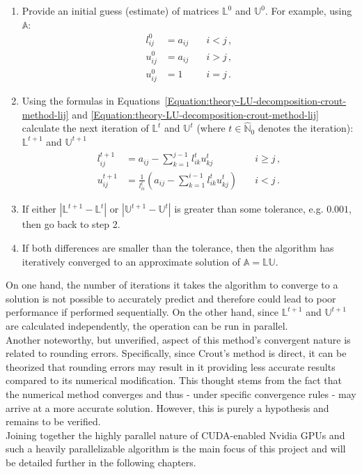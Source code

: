 \begin{enumerate}
	\item Provide an initial guess (estimate) of matrices $ \mathbb{L}^0 $ and $ \mathbb{U}^0 $. For example, using $ \mathbb{A} $:
		\begin{align}
			l_{ij}^{0} &= a_{ij} \quad &i < j \nonumber\,, \\
			u_{ij}^{0} &= a_{ij} \quad &i > j \nonumber\,, \\
			u_{ij}^{0} &= 1 \quad      &i = j \nonumber\,.
		\end{align}
	\item Using the formulas in Equations~\ref{Equation:theory-LU-decomposition-crout-method-lij} and \ref{Equation:theory-LU-decomposition-crout-method-lij} calculate the next iteration of $ \mathbb{L}^{t} $ and $ \mathbb{U}^{t} $ (where $ t \in \widehat{\mathbb{N}}_0 $ denotes the iteration): $ \mathbb{L}^{t+1} $ and $ \mathbb{U}^{t+1} $
		\begin{align}
			l_{ij}^{t+1} &= a_{ij} - \sum_{k=1}^{j-1}l_{ik}^{t}u_{kj}^{t} 								   		&\quad i \geq j \nonumber\,, \\
			u_{ij}^{t+1} &= \frac{1}{l_{ii}^{t}} \left ( a_{ij} - \sum_{k=1}^{i-1}l_{ik}^{t}u_{kj}^{t} \right ) &\quad i < j    \nonumber\,. 
		\end{align}
	\item If either $ \left | \mathbb{L}^{t+1} - \mathbb{L}^{t} \right | $ or $ \left | \mathbb{U}^{t+1} - \mathbb{U}^{t} \right | $ is greater than some tolerance, e.g. $ 0.001 $, then go back to step 2.
	\item If both differences are smaller than the tolerance, then the algorithm has iteratively converged to an approximate solution of $ \mathbb{A} = \mathbb{LU} $.
\end{enumerate}

On one hand, the number of iterations it takes the algorithm to converge to a solution is not possible to accurately predict and therefore could lead to poor performance if performed sequentially. On the other hand, since $ \mathbb{L}^{t+1} $ and $ \mathbb{U}^{t+1} $ are calculated independently, the operation can be run in parallel. \\
Another noteworthy, but unverified, aspect of this method's convergent nature is related to rounding errors. Specifically, since Crout's method is direct, it can be theorized that rounding errors may result in it providing less accurate results compared to its numerical modification. This thought stems from the fact that the numerical method converges and thus - under specific convergence rules - may arrive at a more accurate solution. However, this is purely a hypothesis and remains to be verified. \\
Joining together the highly parallel nature of CUDA-enabled Nvidia GPUs and such a heavily parallelizable algorithm is the main focus of this project and will be detailed further in the following chapters.
